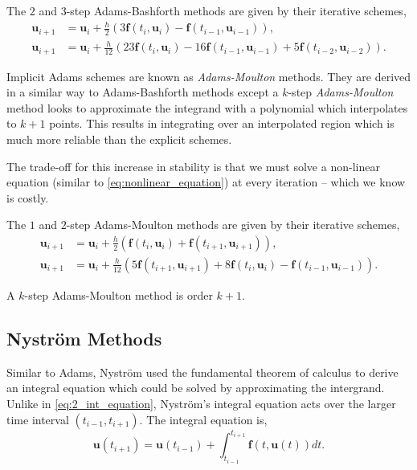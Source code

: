 \documentclass[12pt, twoside]{report}
\theoremstyle{plain}
\theoremstyle{definition}
\theoremstyle{definition}
\begin{document}
            The $2$ and $3$-step Adams-Bashforth methods are given by their 
            iterative schemes,
            \begin{align}
                \mathbf{u}_{i+1} &= \mathbf{u}_{i} + \frac{h}{2} 
                (3\mathbf{f}(t_i, \mathbf{u}_i) - 
                \mathbf{f}(t_{i-1},\mathbf{u}_{i-1})),\\
                \mathbf{u}_{i+1} &= \mathbf{u}_{i} + \frac{h}{12} 
                (23\mathbf{f}(t_i, \mathbf{u}_i) - 
                16\mathbf{f}(t_{i-1},\mathbf{u}_{i-1}) + 
                5\mathbf{f}(t_{i-2}, \mathbf{u}_{i-2})).
            \end{align}

            Implicit Adams schemes are known as \textit{Adams-Moulton} 
            methods. They are derived in a similar way to Adams-Bashforth 
            methods except a $k$-step \textit{Adams-Moulton} method looks to 
            approximate the integrand with a polynomial which interpolates to 
            $k+1$ points. This results in integrating over an interpolated 
            region which is much more reliable than the explicit schemes. 

            The trade-off for this increase in stability is that we must solve
            a non-linear equation (similar to \eqref{eq:nonlinear_equation}) at
            every iteration -- which we know is costly.

            The $1$ and $2$-step Adams-Moulton methods are given by their 
            iterative schemes,
            \begin{align}
                \mathbf{u}_{i+1} &= \mathbf{u}_{i} + \frac{h}{2} 
                (\mathbf{f}(t_i, \mathbf{u}_i) + 
                \mathbf{f}(t_{i+1},\mathbf{u}_{i+1})),\\
                \mathbf{u}_{i+1} &= \mathbf{u}_{i} + \frac{h}{12} 
                (5\mathbf{f}(t_{i+1}, \mathbf{u}_{i+1}) +
                8\mathbf{f}(t_{i},\mathbf{u}_{i}) -
                \mathbf{f}(t_{i-1}, \mathbf{u}_{i-1})).
            \end{align}

            A $k$-step Adams-Moulton method is order $k+1$.


        \subsection{Nystr\"om Methods}
        \label{2_nystrom}
            Similar to Adams, Nystr\"om used the fundamental theorem of 
            calculus to derive an integral equation which could be solved by
            approximating the intergrand. Unlike in \eqref{eq:2_int_equation}, 
            Nystr\"om's integral equation acts over the larger time interval
            $(t_{i-1}, t_{i+1})$. The integral equation is,
            \begin{equation}
            \label{eq:nystrom_int_equation}
                \mathbf{u}(t_{i+1}) = \mathbf{u}(t_{i-1}) 
                + \int_{t_{i-1}}^{t_{i+1}} \mathbf{f}(t, \mathbf{u}(t)) dt.
            \end{equation}
\end{document}
